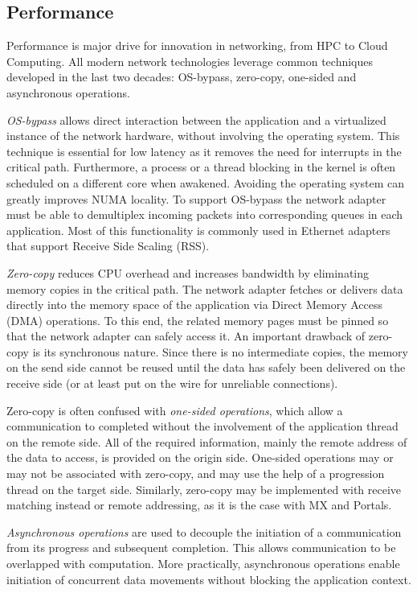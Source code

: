 \subsection{Performance}
Performance is major drive for innovation in networking, from HPC to 
Cloud Computing. All modern network technologies leverage common techniques 
developed in the last two decades: OS-bypass, zero-copy, one-sided and asynchronous operations.

\emph{OS-bypass} allows direct interaction between the application and 
a virtualized instance of the network hardware, without involving the 
operating system. 
This technique is essential for low latency as it removes the need for 
interrupts in the critical path. Furthermore, a process or a thread blocking 
in the kernel is often scheduled on a different core when awakened. Avoiding the 
operating system can greatly improves NUMA locality. 
To support OS-bypass the network adapter must be able to demultiplex incoming 
packets into corresponding queues in each application. Most of this 
functionality is commonly used in Ethernet adapters that support Receive Side 
Scaling (RSS).

\emph{Zero-copy} reduces CPU overhead and increases bandwidth by eliminating 
memory copies in the critical path. The network adapter fetches or delivers 
data directly into the memory space of the application via Direct Memory Access 
(DMA) operations. To this end, the related memory pages must be pinned so 
that the network adapter can safely access it. 
An important drawback of zero-copy is its synchronous nature. Since there is 
no intermediate copies, the memory on the send side cannot be reused until 
the data has safely been delivered on the receive side (or at least put on 
the wire for unreliable connections).

Zero-copy is often confused with \emph{one-sided operations}, which allow a 
communication to completed without the involvement of the application thread 
on the remote side. All of the required information, mainly the remote address 
of the data to access, is provided on the origin side. One-sided operations 
may or may not be associated with zero-copy, and may use the help of a 
progression thread on the target side. Similarly, zero-copy may be implemented 
with receive matching instead or remote addressing, as it is the case with MX 
and Portals.

\emph{Asynchronous operations} are used to decouple the initiation of a 
communication from its progress and subsequent completion. This allows communication to be 
overlapped with computation. 
More practically, asynchronous operations enable initiation of concurrent 
data movements without blocking the application context.

